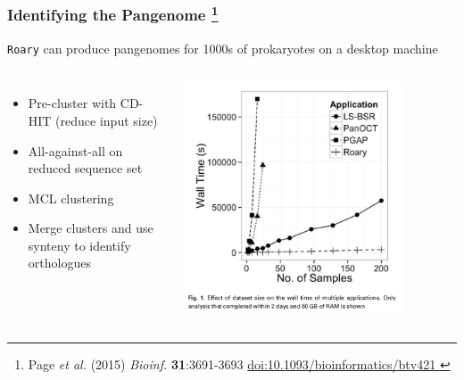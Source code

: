 \begin{frame}
  \frametitle{Identifying the Pangenome
   \footnote{\tiny{Page \textit{et al.} (2015) \textit{Bioinf.} \textbf{31}:3691-3693 \href{http://dx.doi.org/10.1093/bioinformatics/btv421}{doi:10.1093/bioinformatics/btv421
  }}}
  }
  \texttt{Roary} can produce pangenomes for 1000s of prokaryotes on a desktop machine
  \begin{columns}[T] 
      \begin{itemize}
        \item \textcolor{hutton_green}{Pre-cluster with CD-HIT (reduce input size)}
        \item \textcolor{hutton_blue}{All-against-all on reduced sequence set}
        \item \textcolor{hutton_purple}{MCL clustering}
        \item \textcolor{RawSienna}{Merge clusters and use synteny to identify orthologues}        
      \end{itemize}  
        \includegraphics[width=0.8\textwidth]{images/roary_performance}
    \end{columns}  
  \end{frame}

